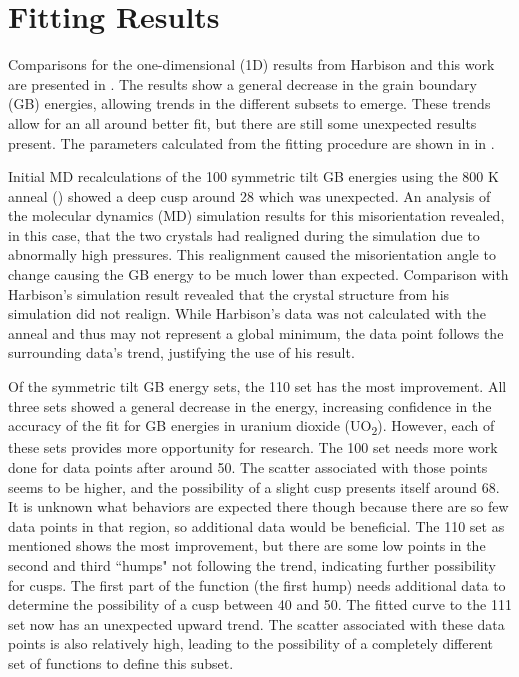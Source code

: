 \documentclass[twoside,senior]{BYUPhys}
\begin{document}
\section{Fitting Results\label{results:fit}}
Comparisons for the one-dimensional (1D) results from Harbison\cite{harbison2015} and this work are presented in .  The results show a general decrease in the grain boundary (GB) energies, allowing trends in the different subsets to emerge.  These trends allow for an all around better fit, but there are still some unexpected results present.  The parameters calculated from the fitting procedure are shown in  in .

Initial MD recalculations of the \textlangle{}100\textrangle{} symmetric tilt GB energies using the 800 K anneal () showed a deep cusp around 28\textdegree{} which was unexpected.  An analysis of the molecular dynamics (MD) simulation results for this misorientation revealed, in this case, that the two crystals had realigned during the simulation due to abnormally high pressures.  This realignment caused the misorientation angle to change causing the GB energy to be much lower than expected.  Comparison with Harbison's simulation result revealed that the crystal structure from his simulation did not realign.  While Harbison's data was not calculated with the anneal and thus may not represent a global minimum, the data point follows the surrounding data's trend, justifying the use of his result.

Of the symmetric tilt GB energy sets, the \textlangle{}110\textrangle{} set has the most improvement.  All three sets showed a general decrease in the energy, increasing confidence in the accuracy of the fit for GB energies in uranium dioxide (UO\textsubscript{2}).  However, each of these sets provides more opportunity for research.  The \textlangle{}100\textrangle{} set needs more work done for data points after around 50\textdegree{}.  The scatter associated with those points seems to be higher, and the possibility of a slight cusp presents itself around 68\textdegree{}.  It is unknown what behaviors are expected there though because there are so few data points in that region, so additional data would be beneficial.  The \textlangle{}110\textrangle{} set as mentioned shows the most improvement, but there are some low points in the second and third ``humps" not following the trend, indicating further possibility for cusps.  The first part of the function (the first hump) needs additional data to determine the possibility of a cusp between 40\textdegree{} and 50\textdegree{}.  The fitted curve to the \textlangle{}111\textrangle{} set now has an unexpected upward trend.  The scatter associated with these data points is also relatively high, leading to the possibility of a completely different set of functions to define this subset.
\end{document}
